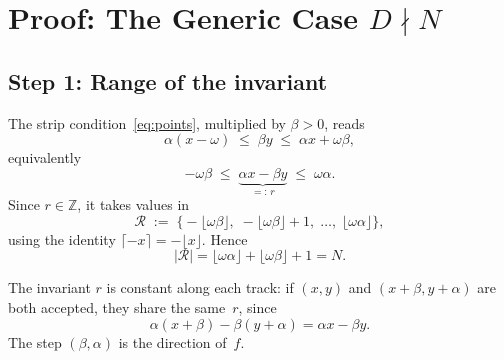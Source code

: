 \documentclass[11pt,reqno]{amsart}
\theoremstyle{plain}
\theoremstyle{definition}
\theoremstyle{remark}
\begin{document}
\section{\texorpdfstring{Proof: The Generic Case \(D \nmid N\)}{Proof: The Generic Case D does not divide N}}\label{sec:proof}

\subsection{Step 1: Range of the invariant}\label{subsec:step1}

The strip condition~\eqref{eq:points}, multiplied by \(\beta > 0\), reads
\[
    \alpha(x - \omega) \;\le\; \beta y \;\le\; \alpha x + \omega\beta,
\]
equivalently
\begin{equation}\label{eq:r_range}
    -\omega\beta \;\le\;
    \underbrace{\alpha x - \beta y}_{=:\,r}
    \;\le\; \omega\alpha.
\end{equation}
Since \(r \in \mathbb{Z}\), it takes values in
\begin{equation}
    \mathcal{R} \;:=\;
    \bigl\{-\lfloor\omega\beta\rfloor,\;
    -\lfloor\omega\beta\rfloor + 1,\; \ldots,\;
    \lfloor\omega\alpha\rfloor\bigr\},
\end{equation}
using the identity \(\lceil{-x}\rceil = -\lfloor x \rfloor\).
Hence
\[
    |\mathcal{R}| =
    \lfloor\omega\alpha\rfloor + \lfloor\omega\beta\rfloor + 1 = N.
\]

The invariant \(r\) is constant along each track: if \((x, y)\) and
\((x + \beta, y + \alpha)\) are both accepted, they share the same~\(r\),
since
\[
    \alpha(x+\beta) - \beta(y+\alpha) = \alpha x - \beta y.
\]
The step \((\beta, \alpha)\) is the direction of~\(f\).
\end{document}
